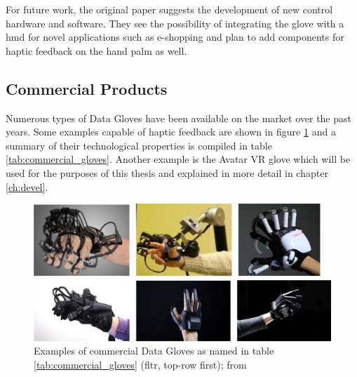 \documentclass[hyperref, bachelorofscience]{cgvpub}
\begin{document}
For future work, the original paper suggests the development of new control hardware and software. They see the possibility of integrating the glove with a \acrfull{hmd} for novel applications such as e-shopping and plan to add components for haptic feedback on the hand palm as well.

\subsection{Commercial Products}
Numerous types of Data Gloves have been available on the market over the past years. Some examples capable of haptic feedback are shown in figure \ref{fig:commercial_gloves} and a summary of their technological properties is compiled in table \ref{tab:commercial_gloves}. Another example is the Avatar VR glove which will be used for the purposes of this thesis and explained in more detail in chapter \ref{ch:devel}.

\begin{figure}[b!]
	\includegraphics[width=\linewidth]{../pics/commercial_gloves}
	\caption{Examples of commercial Data Gloves as named in table \ref{tab:commercial_gloves} (fltr, top-row first); from \cite{wang19}}
	\label{fig:commercial_gloves}
\end{figure}
\end{document}
